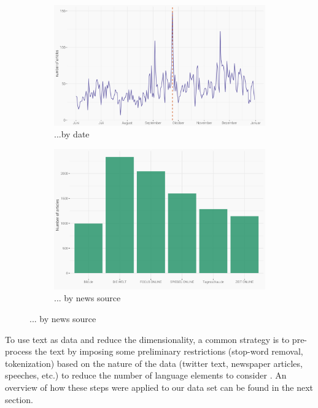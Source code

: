\documentclass[12pt,a4paper,notitlepage]{article}
\begin{document}
\begin{figure}[H]
	\caption{Article distribution...}
	\begin{center}
		\begin{subfigure}[normla]{0.49\textwidth}
			\includegraphics[width=\textwidth]{../figs/timeline.png}
			\caption{...by date}
			\label{fig_distr1}
		\end{subfigure}
		\begin{subfigure}[normla]{0.49\textwidth}
			\includegraphics[width=\textwidth]{../figs/bar.png}
			\caption{... by news source}
			\label{fig_distr2}
		\end{subfigure}
	\end{center}
\end{figure}


To use text as data and reduce the dimensionality, a common strategy is to pre-process the text by imposing some preliminary restrictions (stop-word removal, tokenization) based on the nature of the data (twitter text, newspaper articles, speeches, etc.) to reduce the number of language elements to consider \citep{gentzkow_text_2017}. An overview of how these steps were applied to our data set can be found in the next section. 
\end{document}
